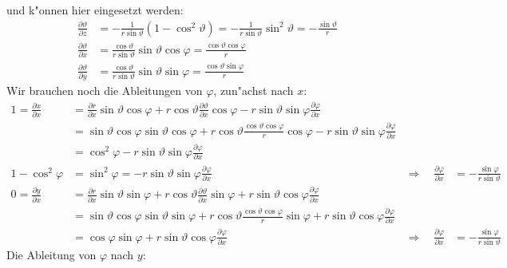 und k"onnen hier eingesetzt werden:
\begin{equation}
\begin{aligned}
\frac{\partial\vartheta}{\partial z}
&=
-\frac{1}{r\sin\vartheta}(1-\cos^2\vartheta)
=
-\frac{1}{r\sin\vartheta}\sin^2\vartheta
=
-\frac{\sin\vartheta}{r}
\\
\frac{\partial \vartheta}{\partial x}
&=
\frac{\cos\vartheta}{r\sin\vartheta}\sin\vartheta\cos\varphi
=
\frac{\cos\vartheta\cos\varphi}{r}
\\
\frac{\partial \vartheta}{\partial y}
&=
\frac{\cos\vartheta}{r\sin\vartheta}\sin\vartheta\sin\varphi
=
\frac{\cos\vartheta\sin\varphi}{r}
\end{aligned}
\label{ableitungenvonvartheta}
\end{equation}
Wir brauchen noch die Ableitungen von $\varphi$, zun"achst nach $x$:
\begin{align*}
1=
\frac{\partial x}{\partial x}
&=
\frac{\partial r}{\partial x}\sin\vartheta\cos\varphi
+
r\cos\vartheta \frac{\partial\vartheta}{\partial x}\cos\varphi
-
r\sin\vartheta\sin\varphi\frac{\partial\varphi}{\partial x}
\\
&=
\sin\vartheta \cos\varphi
\sin\vartheta\cos\varphi
+
r\cos\vartheta
\frac{\cos\vartheta \cos\varphi}{r}
\cos\varphi
-
r\sin\vartheta\sin\varphi
\frac{\partial\varphi}{\partial x}
\\
&=\cos^2\varphi-r\sin\vartheta\sin\varphi\frac{\partial\varphi}{\partial x}
\\
1-\cos^2\varphi
&=
\sin^2\varphi=
-r\sin\vartheta\sin\varphi\frac{\partial\varphi}{\partial x}
&\Rightarrow\quad
\frac{\partial\varphi}{\partial x}
&=-\frac{\sin\varphi}{r\sin\vartheta}
\\
0=
\frac{\partial y}{\partial x}
&=
\frac{\partial r}{\partial x} \sin\vartheta\sin\varphi
+
r\cos\vartheta \frac{\partial\vartheta}{\partial x}\sin\varphi
+
r\sin\vartheta\cos\varphi\frac{\partial\varphi}{\partial x}
\\
&=
\sin\vartheta\cos\varphi
\sin\vartheta\sin\varphi
+
r\cos\vartheta
\frac{\cos\vartheta\cos\varphi}{r}
\sin\varphi
+
r\sin\vartheta\cos\varphi\frac{\partial\varphi}{\partial x}
\\
&=
\cos\varphi\sin\varphi
+
r\sin\vartheta\cos\varphi
\frac{\partial\varphi}{\partial x}
&\Rightarrow\quad
\frac{\partial\varphi}{\partial x}
&=
-\frac{\sin\varphi}{r\sin\vartheta}
\end{align*}
Die Ableitung von $\varphi$ nach $y$:
